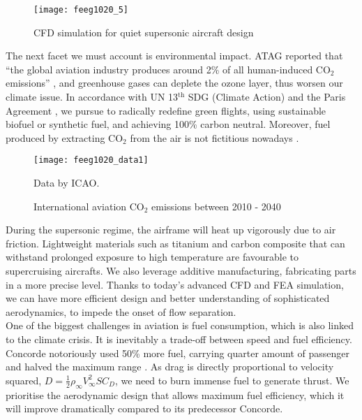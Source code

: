 \documentclass[a4paper,11pt]{article}
\begin{document}
\begin{figure}[h]
\texttt{[image: feeg1020\_5]}
\centering
\caption{CFD simulation for quiet supersonic aircraft design \cite{nasacfd}}
\end{figure}

\vspace{0.5cm}

The next facet we must account is environmental impact. ATAG reported that ``the global aviation industry produces around 2\% of all human-induced CO$_{2}$ emissions'' \cite{atag}, and greenhouse gases can deplete the ozone layer, thus worsen our climate issue. In accordance with UN 13$^{\mathrm{th}}$ SDG (Climate Action) \cite{un} and the Paris Agreement \cite{imers}, we pursue to radically redefine green flights, using sustainable biofuel or synthetic fuel, and achieving 100\% carbon neutral. Moreover, fuel produced by extracting CO$_{2}$ from the air is not fictitious nowadays \cite{natgeo}.\\

\newpage

\begin{figure}[h]
\texttt{[image: feeg1020\_data1]}
\centering
\caption{International aviation CO$_{2}$ emissions between 2010 - 2040 \cite{icaopic}}
Data by ICAO.
\end{figure}

\vspace{0.5cm} 

During the supersonic regime, the airframe will heat up vigorously due to air friction. Lightweight materials such as titanium and carbon composite that can withstand prolonged exposure to high temperature are favourable to supercruising aircrafts. We also leverage additive manufacturing, fabricating parts in a more precise level. Thanks to today's advanced CFD and FEA simulation, we can have more efficient design and better understanding of sophisticated aerodynamics, to impede the onset of flow separation.\\

One of the biggest challenges in aviation is fuel consumption, which is also linked to the climate crisis. It is inevitably a trade-off between speed and fuel efficiency. Concorde notoriously used 50\% more fuel, carrying quarter amount of passenger and halved the maximum range \cite{Youtube4}. As drag is directly proportional to velocity squared, $D = \frac{1}{2}\rho_{\infty} V^{2}_{\infty}SC_{D}$, we need to burn immense fuel to generate thrust. We prioritise the aerodynamic design that allows maximum fuel efficiency, which it will improve dramatically compared to its predecessor Concorde.\\
\end{document}
